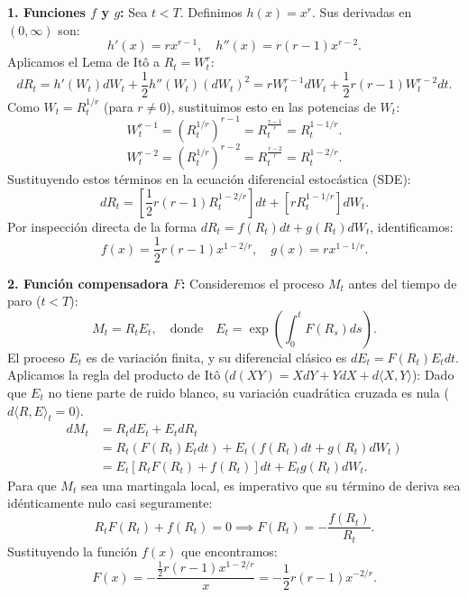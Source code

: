 \documentclass[11pt, letterpaper]{article}
\begin{document}
\begin{solucion}
    \textbf{1. Funciones $f$ y $g$:}
    Sea $t < T$. Definimos $h(x) = x^r$. Sus derivadas en $(0, \infty)$ son:
    \[ h'(x) = r x^{r-1}, \quad h''(x) = r(r-1) x^{r-2}. \]
    Aplicamos el Lema de Itô a $R_t = W_t^r$:
    \[ dR_t = h'(W_t) dW_t + \frac{1}{2} h''(W_t) (dW_t)^2 = r W_t^{r-1} dW_t + \frac{1}{2} r(r-1) W_t^{r-2} dt. \]
    Como $W_t = R_t^{1/r}$ (para $r \neq 0$), sustituimos esto en las potencias de $W_t$:
    \[ W_t^{r-1} = (R_t^{1/r})^{r-1} = R_t^{\frac{r-1}{r}} = R_t^{1 - 1/r}. \]
    \[ W_t^{r-2} = (R_t^{1/r})^{r-2} = R_t^{\frac{r-2}{r}} = R_t^{1 - 2/r}. \]
    Sustituyendo estos términos en la ecuación diferencial estocástica (SDE):
    \[ dR_t = \left[ \frac{1}{2} r(r-1) R_t^{1 - 2/r} \right] dt + \left[ r R_t^{1 - 1/r} \right] dW_t. \]
    Por inspección directa de la forma $dR_t = f(R_t) dt + g(R_t) dW_t$, identificamos:
    \[ f(x) = \frac{1}{2} r(r-1) x^{1 - 2/r}, \quad g(x) = r x^{1 - 1/r}. \]

    \textbf{2. Función compensadora $F$:}
    Consideremos el proceso $M_t$ antes del tiempo de paro ($t < T$):
    \[ M_t = R_t E_t, \quad \text{donde} \quad E_t = \exp\left( \int_0^t F(R_s) ds \right). \]
    El proceso $E_t$ es de variación finita, y su diferencial clásico es $dE_t = F(R_t) E_t dt$.
    Aplicamos la regla del producto de Itô ($d(XY) = X dY + Y dX + d\langle X,Y \rangle$):
    Dado que $E_t$ no tiene parte de ruido blanco, su variación cuadrática cruzada es nula ($d\langle R, E \rangle_t = 0$).
    \begin{align*}
        dM_t &= R_t dE_t + E_t dR_t \\
        &= R_t \left( F(R_t) E_t dt \right) + E_t \left( f(R_t) dt + g(R_t) dW_t \right) \\
        &= E_t \left[ R_t F(R_t) + f(R_t) \right] dt + E_t g(R_t) dW_t.
    \end{align*}
    Para que $M_t$ sea una martingala local, es imperativo que su término de deriva sea idénticamente nulo casi seguramente:
    \[ R_t F(R_t) + f(R_t) = 0 \implies F(R_t) = -\frac{f(R_t)}{R_t}. \]
    Sustituyendo la función $f(x)$ que encontramos:
    \[ F(x) = -\frac{\frac{1}{2} r(r-1) x^{1 - 2/r}}{x} = -\frac{1}{2} r(r-1) x^{-2/r}. \]


\end{solucion}
\end{document}
